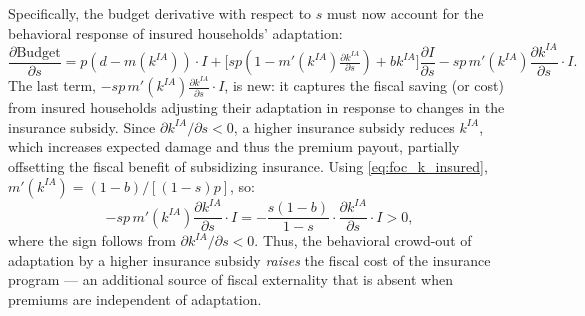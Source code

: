 \documentclass{article}
\begin{document}
Specifically, the budget derivative with respect to $s$ must now account for the behavioral response of insured households' adaptation:
\begin{equation}
    \frac{\partial\text{Budget}}{\partial s}
    = p(d-m(k^{IA}))\cdot I
    + \bigl[sp(1-m'(k^{IA})\tfrac{\partial k^{IA}}{\partial s}) + bk^{IA}\bigr]\frac{\partial I}{\partial s}
    - sp\,m'(k^{IA})\frac{\partial k^{IA}}{\partial s}\cdot I. \label{eq:budget_s_premium_cont}
\end{equation}
The last term, $-sp\,m'(k^{IA})\frac{\partial k^{IA}}{\partial s}\cdot I$, is new: it captures the fiscal saving (or cost) from insured households adjusting their adaptation in response to changes in the insurance subsidy. Since $\partial k^{IA}/\partial s < 0$, a higher insurance subsidy reduces $k^{IA}$, which increases expected damage and thus the premium payout, partially offsetting the fiscal benefit of subsidizing insurance. Using \eqref{eq:foc_k_insured}, $m'(k^{IA}) = (1-b)/[(1-s)p]$, so:
\begin{equation}
    -sp\,m'(k^{IA})\frac{\partial k^{IA}}{\partial s}\cdot I
    = -\frac{s(1-b)}{1-s}\cdot\frac{\partial k^{IA}}{\partial s}\cdot I > 0,
\end{equation}
where the sign follows from $\partial k^{IA}/\partial s < 0$. Thus, the behavioral crowd-out of adaptation by a higher insurance subsidy \emph{raises} the fiscal cost of the insurance program — an additional source of fiscal externality that is absent when premiums are independent of adaptation.
\end{document}
